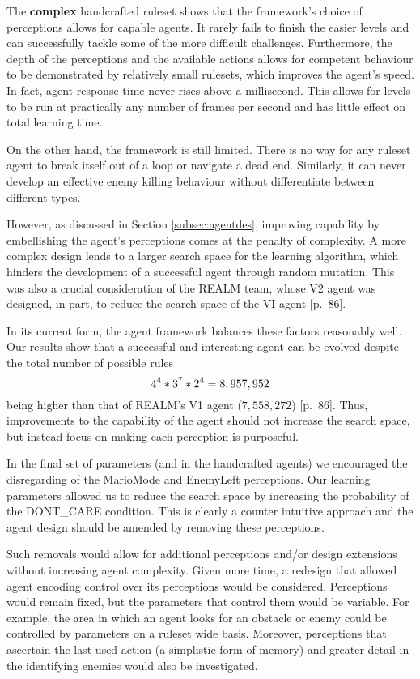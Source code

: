 The \textbf{complex} handcrafted ruleset shows that the framework's choice of perceptions allows for capable agents. It rarely fails to finish the easier levels and can successfully tackle some of the more difficult challenges. Furthermore, the depth of the perceptions and the available actions allows for competent behaviour to be demonstrated by relatively small rulesets, which improves the agent's speed. In fact, agent response time never rises above a millisecond. This allows for levels to be run at practically any number of frames per second and has little effect on total learning time.

On the other hand, the framework is still limited. There is no way for any ruleset agent to break itself out of a loop or navigate a dead end. Similarly, it can never develop an effective enemy killing behaviour without differentiate between different types.

However, as discussed in Section \ref{subsec:agentdes}, improving capability by embellishing the agent's perceptions comes at the penalty of complexity. A more complex design lends to a larger search space for the learning algorithm, which hinders the development of a successful agent through random mutation. This was also a crucial consideration of the REALM team, whose V2 agent was designed, in part, to reduce the search space of the VI agent \cite{realm}[p.~86].

In its current form, the agent framework balances these factors reasonably well. Our results show that a successful and interesting agent can be evolved despite the total number of possible rules
\[ \centering
4^4 * 3^7 * 2^4 = 8,957,952
\]
being higher than that of REALM's V1 agent ($7,558,272$) \cite{realm}[p.~86]. Thus, improvements to the capability of the agent should not increase the search space, but instead focus on making each perception is purposeful.

In the final set of parameters (and in the handcrafted agents) we encouraged the disregarding of the MarioMode and EnemyLeft perceptions. Our learning parameters allowed us to reduce the search space by increasing the probability of the {\footnotesize DONT\_CARE} condition. This is clearly a counter intuitive approach and the agent design should be amended by removing these perceptions. 

Such removals would allow for additional perceptions and/or design extensions without increasing agent complexity. Given more time, a redesign that allowed agent encoding control over its perceptions would be considered. Perceptions would remain fixed, but the parameters that control them would be variable. For example, the area in which an agent looks for an obstacle or enemy could be controlled by parameters on a ruleset wide basis. Moreover, perceptions that ascertain the last used action (a simplistic form of memory) and greater detail in the identifying enemies would also be investigated.


